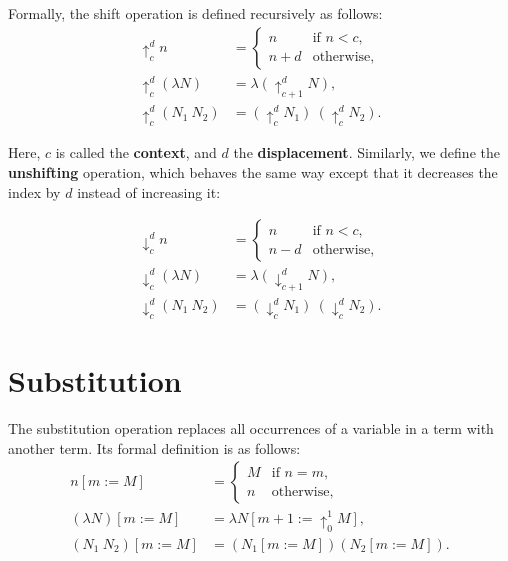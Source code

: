 \begin{definition}[shifting]
  \label{def:shift}
  \leanok
  Formally, the shift operation is defined recursively as follows:
  \[
    \begin{aligned}
      \uparrow_c^d n &=
      \begin{cases}
        n & \text{if } n < c, \\
        n + d & \text{otherwise},
      \end{cases} \\[1em]
      \uparrow_c^d(\lambda N) &= \lambda (\uparrow_{c + 1}^d N), \\[0.5em]
      \uparrow_c^d(N_1\ N_2) &= (\uparrow_c^d N_1)\ (\uparrow_c^d N_2).
    \end{aligned}
  \]
\end{definition}

Here, \(c\) is called the \textbf{context}, and \(d\) the \textbf{displacement}.
Similarly, we define the \textbf{unshifting} operation, which behaves the same
way except that it decreases the index by $d$ instead of increasing it:

\begin{definition}[unshifting]
  \label{def:unshift}
  \leanok
  \[
    \begin{aligned}
      \downarrow_c^d n &=
      \begin{cases}
        n & \text{if } n < c, \\
        n - d & \text{otherwise},
      \end{cases} \\[1em]
      \downarrow_c^d (\lambda N) &= \lambda (\downarrow_{c + 1}^d N), \\[0.5em]
      \downarrow_c^d (N_1\ N_2) &= (\downarrow_c^d N_1)\ (\downarrow_c^d N_2).
    \end{aligned}
  \]
\end{definition}

\section{Substitution}

\begin{definition}[Substitution]
  \label{def:substitution}
  \leanok
  The substitution operation replaces all occurrences of a variable in a term with another term.
  Its formal definition is as follows:
  \[
    \begin{aligned}
      n[m := M]&=
      \begin{cases}
        M & \text{if } n = m, \\
        n & \text{otherwise},
      \end{cases} \\[1em]
      (\lambda N)[m := M] &= \lambda N[m + 1 := \uparrow_0^1 M], \\[0.5em]
      (N_1\ N_2)[m := M] &= (N_1 [m := M]) (N_2 [m := M]).
    \end{aligned}
  \]
\end{definition}

